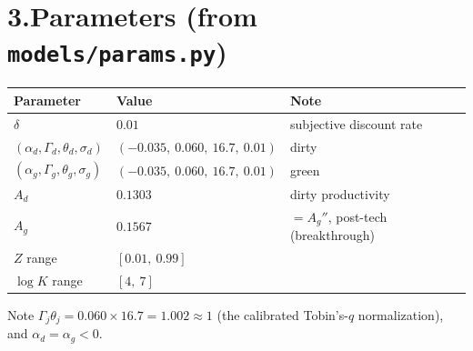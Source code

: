 \documentclass[11pt]{article}
\begin{document}
\section*{3.\quad Parameters (from \texttt{models/params.py})}

\begin{center}
\begin{tabular}{lll}
\toprule
Parameter & Value & Note\\
\midrule
$\delta$ & $0.01$ & subjective discount rate\\
$(\alpha_d,\Gamma_d,\theta_d,\sigma_d)$ & $(-0.035,\ 0.060,\ 16.7,\ 0.01)$ & dirty\\
$(\alpha_g,\Gamma_g,\theta_g,\sigma_g)$ & $(-0.035,\ 0.060,\ 16.7,\ 0.01)$ & green\\
$A_d$ & $0.1303$ & dirty productivity\\
$A_g$ & $0.1567$ & $=A_g''$, post-tech (breakthrough)\\
$Z$ range & $[0.01,\ 0.99]$ & \\
$\log K$ range & $[4,\ 7]$ & \\
\bottomrule
\end{tabular}
\end{center}

Note $\Gamma_j\theta_j=0.060\times16.7=1.002\approx1$ (the calibrated Tobin's-$q$
normalization), and $\alpha_d=\alpha_g<0$.
\end{document}
